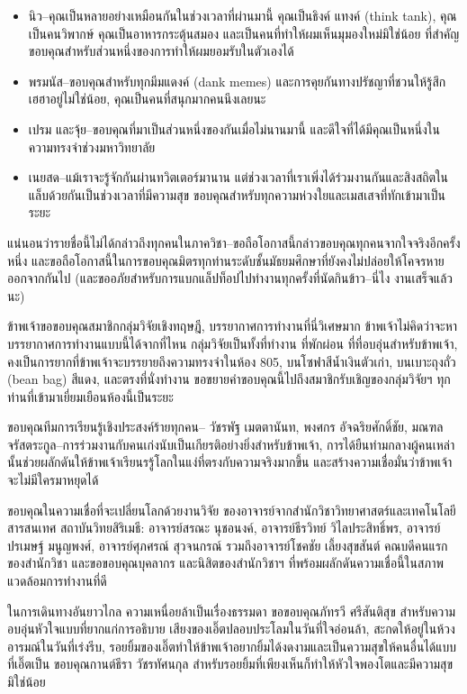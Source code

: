 \begin{itemize}
    \item นิว--คุณเป็นหลายอย่างเหมือนกันในช่วงเวลาที่ผ่านมานี้ คุณเป็นธิงค์ แทงค์ (think tank), คุณเป็นคนวิพากษ์ คุณเป็นอาหารกระตุ้นสมอง และเป็นคนที่ทำให้ผมเห็นมุมองใหม่มิใช่น้อย ที่สำคัญ ขอบคุณสำหรับส่วนหนึ่งของการทำให้ผมยอมรับในตัวเองได้
    \item พรมนัส--ขอบคุณสำหรับทุกมีมแดงค์ (dank memes) และการคุยกันทางปรัชญาที่ชวนให้รู้สึกเฮฮาอยู่ไม่ใช่น้อย, คุณเป็นคนที่สนุกมากคนนึงเลยนะ
    \item เปรม และจุ้ย--ขอบคุณที่มาเป็นส่วนหนึ่งของกันเมื่อไม่นานมานี้ และดีใจที่ได้มีคุณเป็นหนึ่งในความทรงจำช่วงมหาวิทยาลัย
    \item เนยสด--แม้เราจะรู้จักกันผ่านทวิตเตอร์มานาน แต่ช่วงเวลาที่เราเพิ่งได้ร่วมงานกันและสิงสถิตในแล็บด้วยกันเป็นช่วงเวลาที่มีความสุข ขอบคุณสำหรับทุกความห่วงใยและเมสเสจที่ทักเข้ามาเป็นระยะ
\end{itemize}
แน่นอนว่ารายชื่อนี้ไม่ได้กล่าวถึงทุกคนในภาควิชา--ขอถือโอกาสนี้กล่าวขอบคุณทุกคนจากใจจริงอีกครั้งหนึ่ง และขอถือโอกาสนี้ในการขอบคุณมิตรทุกท่านระดับชั้นมัธยมศึกษาที่ยังคงไม่ปล่อยให้โคจรหายออกจากกันไป (และขออภัยสำหรับการแบกแล็ปท็อปไปทำงานทุกครั้งที่นัดกินข้าว--นี่ไง งานเสร็จแล้วนะ)

ข้าพเจ้าขอขอบคุณสมาชิกกลุ่มวิจัยเชิงทฤษฎี, บรรยากาศการทำงานที่นี่วิเศษมาก ข้าพเจ้าไม่คิดว่าจะหาบรรยากาศการทำงานแบบนี้ได้จากที่ไหน กลุ่มวิจัยเป็นทั้งที่ทำงาน ที่พักผ่อน ที่ที่อบอุ่นสำหรับข้าพเจ้า, คงเป็นการยากที่ข้าพเจ้าจะบรรยายถึงความทรงจำในห้อง 805, บนโซฟาสีน้ำเงินตัวเก่า, บนเบาะถุงถั่ว (bean bag) สีแดง, และตรงที่นั่งทำงาน ขอขยายคำขอบคุณนี้ไปถึงสมาชิกรับเชิญของกลุ่มวิจัยฯ ทุกท่านที่เข้ามาเยี่ยมเยือนห้องนี้เป็นระยะ

ขอบคุณทีมการเรียนรู้เชิงประสงค์ร้ายทุกคน--
วัชรพัฐ เมตตานันท, พงศกร อัจฉริยศักดิ์ชัย, มณฑล จรัสตระกูล--การร่วมงานกับคนเก่งนับเป็นเกียรติอย่างยิ่งสำหรับข้าพเจ้า, การได้ยืนท่ามกลางผู้คนเหล่านั้นช่วยผลักดันให้ข้าพเจ้าเรียนรรู้โลกในแง่ที่ตรงกับความจริงมากขึ้น และสร้างความเชื่อมั่นว่าข้าพเจ้าจะไม่มีใครมาหยุดได้

ขอบคุณในความเชื่อที่จะเปลี่ยนโลกด้วยงานวิจัย ของอาจารย์จากสำนักวิชาวิทยาศาสตร์และเทคโนโลยีสารสนเทศ สถาบันวิทยสิริเมธี: อาจารย์สรณะ นุชอนงค์, อาจารย์ธีรวิทย์ วิไลประสิทธิ์พร, อาจารย์ปรเมษฐ์ มนูญพงศ์, อาจารย์ศุภศรณ์ สุวจนกรณ์ รวมถึงอาจารย์โชคชัย เลี้ยงสุขสันต์ คณบดีคนแรกของสำนักวิชา และขอขอบคุณบุคลากร และนิสิตของสำนักวิชาฯ ที่พร้อมผลักดันความเชื่อนี้ในสภาพแวดล้อมการทำงานที่ดี

ในการเดินทางอันยาวไกล ความเหนื่อยล้าเป็นเรื่องธรรมดา ขอขอบคุณภัทรวี ศรีสันติสุข สำหรับความอบอุ่นหัวใจแบบที่ยากแก่การอธิบาย เสียงของเอิ๊ตปลอบประโลมในวันที่ใจอ่อนล้า, สะกดให้อยู่ในห้วงอารมณ์ในวันที่เร่งรีบ, รอยยิ้มของเอิ๊ตทำให้ข้าพเจ้าอยากยิ้มได้งดงามและเป็นความสุขให้คนอื่นได้แบบที่เอิ๊ตเป็น ขอบคุณกานต์ธีรา วัชรทัศนกุล สำหรับรอยยิ้มที่เพียงเห็นก็ทำให้หัวใจพองโตและมีความสุขมิใช่น้อย

